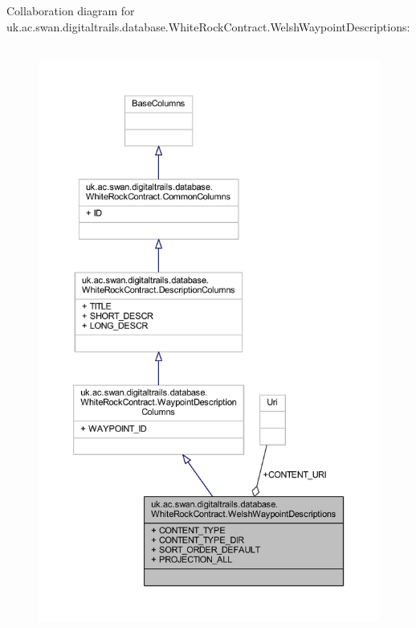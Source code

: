 Collaboration diagram for uk.\+ac.\+swan.\+digitaltrails.\+database.\+White\+Rock\+Contract.\+Welsh\+Waypoint\+Descriptions\+:
\nopagebreak
\begin{figure}[H]
\begin{center}
\leavevmode
\includegraphics[height=550pt]{classuk_1_1ac_1_1swan_1_1digitaltrails_1_1database_1_1_white_rock_contract_1_1_welsh_waypoint_descriptions__coll__graph}
\end{center}
\end{figure}
